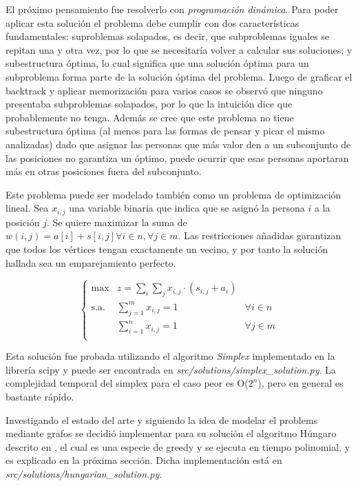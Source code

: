 \documentclass[10pt]{article} %
\begin{document}
	El pr\'oximo pensamiento fue resolverlo con \textit{programaci\'on din\'amica}. Para poder aplicar esta soluci\'on el problema debe cumplir con dos caracter\'isticas fundamentales: suproblemas solapados, es decir, que subproblemas iguales se repitan una y otra vez, por lo que se necesitar\'ia volver a calcular sus soluciones; y subestructura \'optima, lo cual significa que una soluci\'on \'optima para un subproblema forma parte de la soluci\'on \'optima del problema. Luego de graficar el backtrack y aplicar memorizaci\'on para varios casos se observ\'o que ninguno presentaba subproblemas solapados, por lo que la intuici\'on dice que probablemente no tenga.
	Adem\'as se cree que este problema no tiene subestructura \'optima (al menos para las formas de pensar y picar el mismo analizadas) dado que asignar las personas que m\'as valor den a un subconjunto de las posiciones no garantiza un \'optimo, puede ocurrir que esas personas aportaran m\'as en otras posiciones fuera del subconjunto. 
	
	Este problema puede ser modelado tambi\'en como un problema de optimizaci\'on lineal. Sea $ x_{i, j} $ una variable binaria que indica que se asign\'o la persona $ i $ a la posici\'on $ j $. Se quiere maximizar la suma de $ w(i, j) = a[i] + s[i, j] \forall i \in n, \forall j \in m $. Las restricciones a\~nadidas  garantizan que todos los v\'ertices tengan exactamente un vecino, y por tanto la soluci\'on hallada sea un emparejamiento perfecto. 
	
	\begin{equation} \left\{
	\begin{matrix}
		\max & \displaystyle z=\sum_{i}\sum_{j}x_{i,j}\cdot(s_{i,j} + a_{i}) \\
		\textrm{s.a.} & \sum_{j=1}^{m} x_{i, j} = 1 & \forall i \in n \\
		& \sum_{i=1}^{n} x_{i, j} = 1 & \forall j \in m \\ 
	\end{matrix} \right. 
	\end{equation} 

	Esta soluci\'on fue probada utilizando el algoritmo \textit{Simplex} implementado en la librer\'ia scipy y puede ser encontrada en \textit{src/solutions/simplex\_solution.py}. La complejidad temporal del simplex para el caso peor es O($ 2^{n} $), pero en general es bastante r\'apido.
	
	Investigando el estado del arte y siguiendo la idea de modelar el problems mediante grafos se decidi\'o implementar para su soluci\'on el algoritmo H\'ungaro descrito en \cite{introduction}, el cual es una especie de greedy y se ejecuta en tiempo polinomial, y es explicado en la pr\'oxima secci\'on. Dicha implementaci\'on est\'a en \textit{src/solutions/hungarian\_solution.py}.
	
\end{document}
